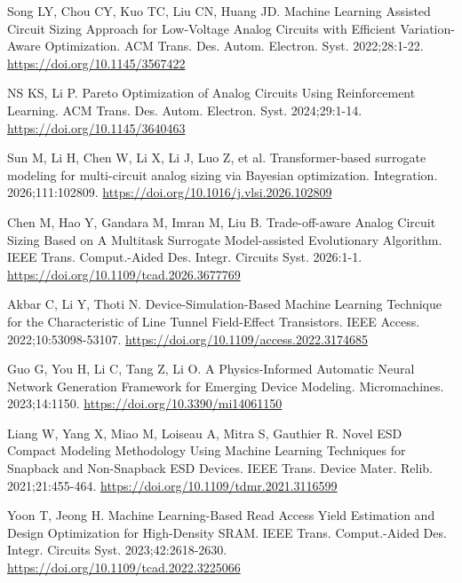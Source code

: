 Song LY, Chou CY, Kuo TC, Liu CN, Huang JD. Machine Learning Assisted Circuit Sizing Approach for Low-Voltage Analog Circuits with Efficient Variation-Aware Optimization. ACM Trans. Des. Autom. Electron. Syst. 2022;28:1-22.
\href{https://doi.org/10.1145/3567422}{https://doi.org/10.1145/3567422}

NS KS, Li P. Pareto Optimization of Analog Circuits Using Reinforcement Learning. ACM Trans. Des. Autom. Electron. Syst. 2024;29:1-14.
\href{https://doi.org/10.1145/3640463}{https://doi.org/10.1145/3640463}

Sun M, Li H, Chen W, Li X, Li J, Luo Z, et al. Transformer-based surrogate modeling for multi-circuit analog sizing via Bayesian optimization. Integration. 2026;111:102809.
\href{https://doi.org/10.1016/j.vlsi.2026.102809}{https://doi.org/10.1016/j.vlsi.2026.102809}

Chen M, Hao Y, Gandara M, Imran M, Liu B. Trade-off-aware Analog Circuit Sizing Based on A Multitask Surrogate Model-assisted Evolutionary Algorithm. IEEE Trans. Comput.-Aided Des. Integr. Circuits Syst. 2026:1-1.
\href{https://doi.org/10.1109/tcad.2026.3677769}{https://doi.org/10.1109/tcad.2026.3677769}

Akbar C, Li Y, Thoti N. Device-Simulation-Based Machine Learning Technique for the Characteristic of Line Tunnel Field-Effect Transistors. IEEE Access. 2022;10:53098-53107.
\href{https://doi.org/10.1109/access.2022.3174685}{https://doi.org/10.1109/access.2022.3174685}

Guo G, You H, Li C, Tang Z, Li O. A Physics-Informed Automatic Neural Network Generation Framework for Emerging Device Modeling. Micromachines. 2023;14:1150.
\href{https://doi.org/10.3390/mi14061150}{https://doi.org/10.3390/mi14061150}

Liang W, Yang X, Miao M, Loiseau A, Mitra S, Gauthier R. Novel ESD Compact Modeling Methodology Using Machine Learning Techniques for Snapback and Non-Snapback ESD Devices. IEEE Trans. Device Mater. Relib. 2021;21:455-464.
\href{https://doi.org/10.1109/tdmr.2021.3116599}{https://doi.org/10.1109/tdmr.2021.3116599}

Yoon T, Jeong H. Machine Learning-Based Read Access Yield Estimation and Design Optimization for High-Density SRAM. IEEE Trans. Comput.-Aided Des. Integr. Circuits Syst. 2023;42:2618-2630.
\href{https://doi.org/10.1109/tcad.2022.3225066}{https://doi.org/10.1109/tcad.2022.3225066}


